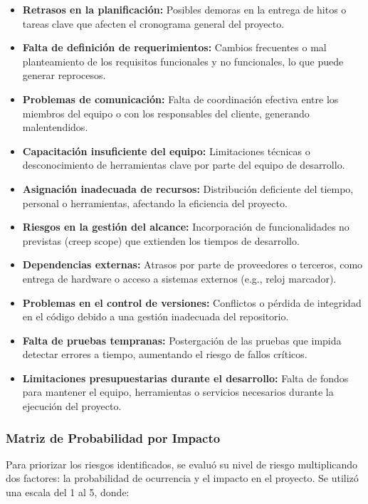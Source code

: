 \begin{itemize}
	\item \textbf{Retrasos en la planificación:} Posibles demoras en la entrega de hitos o tareas clave que afecten el cronograma general del proyecto.
	\item \textbf{Falta de definición de requerimientos:} Cambios frecuentes o mal planteamiento de los requisitos funcionales y no funcionales, lo que puede generar reprocesos.
	\item \textbf{Problemas de comunicación:} Falta de coordinación efectiva entre los miembros del equipo o con los responsables del cliente, generando malentendidos.
	\item \textbf{Capacitación insuficiente del equipo:} Limitaciones técnicas o desconocimiento de herramientas clave por parte del equipo de desarrollo.
	\item \textbf{Asignación inadecuada de recursos:} Distribución deficiente del tiempo, personal o herramientas, afectando la eficiencia del proyecto.
	\item \textbf{Riesgos en la gestión del alcance:} Incorporación de funcionalidades no previstas (creep scope) que extienden los tiempos de desarrollo.
	\item \textbf{Dependencias externas:} Atrasos por parte de proveedores o terceros, como entrega de hardware o acceso a sistemas externos (e.g., reloj marcador).
	\item \textbf{Problemas en el control de versiones:} Conflictos o pérdida de integridad en el código debido a una gestión inadecuada del repositorio.
	\item \textbf{Falta de pruebas tempranas:} Postergación de las pruebas que impida detectar errores a tiempo, aumentando el riesgo de fallos críticos.
	\item \textbf{Limitaciones presupuestarias durante el desarrollo:} Falta de fondos para mantener el equipo, herramientas o servicios necesarios durante la ejecución del proyecto.
\end{itemize}

\subsubsection*{Matriz de Probabilidad por Impacto}

Para priorizar los riesgos identificados, se evaluó su nivel de riesgo multiplicando dos factores: la probabilidad de ocurrencia y el impacto en el proyecto. Se utilizó una escala del 1 al 5, donde:

